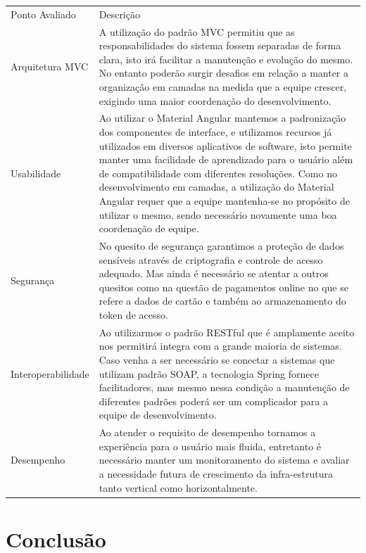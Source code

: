  \noindent
 \begin{tabular}{|>{\raggedright\arraybackslash}p{4cm}|>{\raggedright\arraybackslash}p{10cm}|}
    \hline
    \cellcolor[gray]{0.8}Ponto Avaliado & \cellcolor[gray]{0.8}Descrição \\
    Arquitetura MVC & A utilização do padrão MVC permitiu que as responsabilidades do sistema fossem separadas de forma clara, isto irá facilitar a manutenção e evolução do mesmo. No entanto poderão surgir desafios em relação a manter a organização em camadas na medida que a equipe crescer, exigindo uma maior coordenação do desenvolvimento.\\
    \hline
    Usabilidade & Ao utilizar o Material Angular mantemos a padronização dos componentes de interface, e utilizamos recursos já utilizados em diversos aplicativos de software,
    isto permite manter uma facilidade de aprendizado para o usuário além de compatibilidade com diferentes resoluções. Como no desenvolvimento em camadas, a utilização do Material Angular
    requer que a equipe mantenha-se no propósito de utilizar o mesmo, sendo necessário novamente uma boa coordenação de equipe.\\
    \hline
    Segurança & No quesito de segurança garantimos a proteção de dados sensíveis através de criptografia e controle de acesso adequado. Mas ainda é necessário
    se atentar a outros quesitos como na questão de pagamentos online no que se refere a dados de cartão e também ao armazenamento do token de acesso.\\
    \hline
    Interoperabilidade & Ao utilizarmos o padrão RESTful que é amplamente aceito nos permitirá integra com a grande maioria de sistemas. Caso venha a ser 
    necessário se conectar a sistemas que utilizam padrão SOAP, a tecnologia Spring fornece facilitadores, mas mesmo nessa condição a manutenção de diferentes padrões poderá
    ser um complicador para a equipe de desenvolvimento.\\
    \hline
    Desempenho & Ao atender o requisito de desempenho tornamos a experiência para o usuário mais fluida, entretanto é necessário manter um monitoramento do sistema 
    e avaliar a necessidade futura de crescimento da infra-estrutura tanto vertical como horizontalmente.\\
    \hline
 \end{tabular}

 \chapter{Conclusão}


